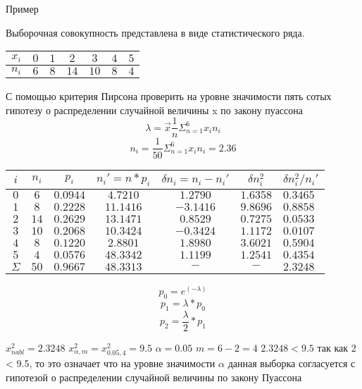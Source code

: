 \documentclass[a4paper]{article}
\begin{document}
Пример

Выборочная совокупность представлена в виде статистического ряда.
\begin{table}[H]
    \centering
    \begin{tabular}{|c|c|c|c|c|c|}
        \hline
        $x_i$   & $0$ & $1$ & $2$ & $3$ & $4$ & $5$ \\
        \hline
        $n_i$ & $6$ & $8$ & $14$ & $10$ & $8$ & $4$\\
        \hline
    \end{tabular}
\end{table}

С помощью критерия Пирсона проверить на уровне значимости пять сотых гипотезу о распределении случайной величины x по закону пуассона
$$ \lambda = \vec{x}\frac{1}{n}\Sigma_{n=1}^6x_in_i$$
$$ n_i = \frac{1}{50}\Sigma_{n=1}^6x_in_i = 2.36 $$


\begin{table}[H]
    \centering
    \begin{tabular}{|c|c|c|c|c|c|}
        \hline
        $i$   & $n_i$ & $p_i$ & $n_i' = n*p_i$ & $\delta n_i = n_i - n_i'$ & $\delta n_i^2$ & $\delta n_i^2 / n_i' $ \\
        \hline
        $0$ & $ 6 $  & $0.0944$ & $4.7210$  & $1.2790$ & $ 1.6358$ & $0.3465$  \\
        $1$ & $ 8 $  & $0.2228$ & $11.1416$ & $-3.1416$ & $ 9.8696 $ & $0.8858$  \\
        $2$ & $ 14 $ & $0.2629$ & $13.1471$ & $0.8529$ & $ 0.7275 $ & $0.0533$  \\
        $3$ & $ 10 $ & $0.2068$ & $10.3424$ & $-0.3424$ & $ 1.1172 $ & $0.0107$  \\
        $4$ & $ 8 $  & $0.1220$ & $2.8801$  & $1.8980$ & $ 3.6021$ & $0.5904$  \\
        $5$ & $ 4 $  & $0.0576$ & $48.3342$ & $1.1199$ & $ 1.2541 $ & $0.4354$  \\
        $\Sigma$ & $50$ & $0.9667$ & $48.3313$ & $-$ & $-$ & $2.3248$ \\  
        \hline
    \end{tabular}
\end{table}

$$ p_0 = e^(-\lambda)$$
$$ p_1 = \lambda * p_0$$
$$ p_2 = \frac{\lambda}{2} * p_1$$

$x^2_{nabl} = 2.3248$
$x^2_{\alpha, m} = x^2_{0.05, 4} = 9.5$
$ \alpha = 0.05 $
$ m = 6 - 2 = 4$
$2.3248 < 9.5$
так как 2 < 9.5, то это означает что на уровне значимости $\alpha$ данная выборка согласуется с гипотезой о распределении случайной величины по закону Пуассона
\end{document}
